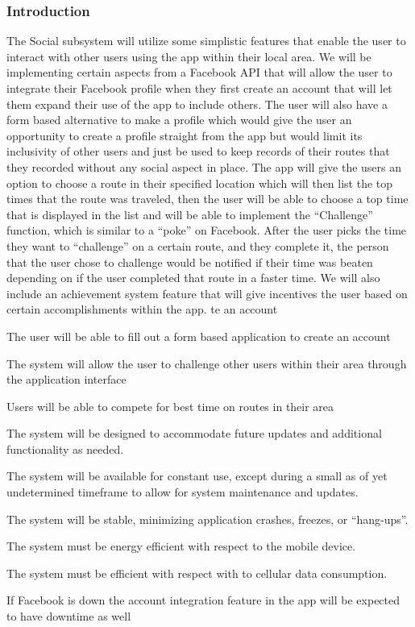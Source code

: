 \documentclass{article}
\begin{document}
\subsubsection{Introduction}
The Social subsystem will utilize some simplistic features that enable the user to interact with other users using the app within their local area. We will be implementing certain aspects from a Facebook API that will allow the user to integrate their Facebook profile when they first create an account that will let them expand their use of the app to include others. The user will also have a form based alternative to make a profile which would give the user an opportunity to create a profile straight from the app but would limit its inclusivity of other users and just be used to keep records of their routes that they recorded without any social aspect in place. 
The app will give the users an option to choose a route in their specified location which will then list the top times that the route was traveled, then the user will be able to choose a top time that is displayed in the list and will be able to implement the “Challenge” function, which is similar to a “poke” on Facebook. After the user picks the time they want to “challenge” on a certain route, and they complete it, the person that the user chose to challenge would be notified if their time was beaten depending on if the user completed that route in a faster time.
We will also include an achievement system feature that will give incentives the user based on certain accomplishments within the app.
te an account
    \item The user will be able to fill out a form based application to create an account
    \item The system will allow the user to challenge other users within their area through the application interface
    \item Users will be able to compete for best time on routes in their area
    \item The system will be designed to accommodate future updates and additional functionality as needed.
    \item The system will be available for constant use, except during a small as of yet undetermined timeframe to allow for system maintenance and updates.
    \item The system will be stable, minimizing application crashes, freezes, or “hang-ups”.
    \item The system must be energy efficient with respect to the mobile device.
    \item The system must be efficient with respect with to cellular data consumption.
    \item If Facebook is down the account integration feature in the app will be expected to have downtime as well
\end{document}
